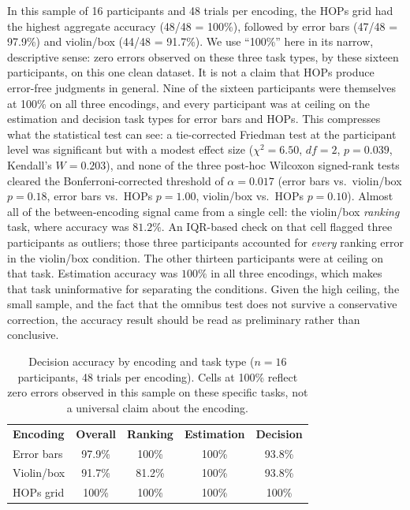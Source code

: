 \documentclass{article}
\begin{document}
In this sample of 16 participants and 48 trials per encoding, the HOPs
grid had the highest aggregate accuracy (48/48 = 100\%), followed by
error bars (47/48 = 97.9\%) and violin/box (44/48 = 91.7\%).  We use
``100\%'' here in its narrow, descriptive sense: zero errors observed
on these three task types, by these sixteen participants, on this one
clean dataset.  It is not a claim that HOPs produce error-free
judgments in general.  Nine of the sixteen participants were
themselves at 100\% on all three encodings, and every participant was
at ceiling on the estimation and decision task types for error bars
and HOPs.  This compresses what the statistical test can see:
a tie-corrected Friedman test at the participant level was significant
but with a modest effect size ($\chi^2 = 6.50$, $df = 2$, $p = 0.039$,
Kendall's $W = 0.203$), and none of the three post-hoc Wilcoxon
signed-rank tests cleared the Bonferroni-corrected threshold of
$\alpha = 0.017$ (error bars vs.\ violin/box $p = 0.18$, error bars
vs.\ HOPs $p = 1.00$, violin/box vs.\ HOPs $p = 0.10$).  Almost all of
the between-encoding signal came from a single cell: the violin/box
\emph{ranking} task, where accuracy was $81.2\%$.  An IQR-based check
on that cell flagged three participants as outliers; those three
participants accounted for \emph{every} ranking error in the violin/box
condition.  The other thirteen participants were at ceiling on that
task.  Estimation accuracy was $100\%$ in all three encodings, which
makes that task uninformative for separating the conditions.  Given
the high ceiling, the small sample, and the fact that the omnibus
test does not survive a conservative correction, the accuracy result
should be read as preliminary rather than conclusive.

\begin{table}[ht]
\centering
\caption{Decision accuracy by encoding and task type ($n = 16$
  participants, 48 trials per encoding).  Cells at 100\% reflect zero
  errors observed in this sample on these specific tasks, not a
  universal claim about the encoding.}
\label{tab:accuracy}
\begin{tabular}{lcccc}
\rowcolor{navyhead}
\color{white}\textbf{Encoding} &
\color{white}\textbf{Overall} &
\color{white}\textbf{Ranking} &
\color{white}\textbf{Estimation} &
\color{white}\textbf{Decision} \\
Error bars  & 97.9\% & 100\%  & 100\%  & 93.8\% \\
Violin/box  & 91.7\% & 81.2\% & 100\%  & 93.8\% \\
HOPs grid   & 100\%  & 100\%  & 100\%  & 100\%  \\
\end{tabular}
\end{table}
\end{document}
